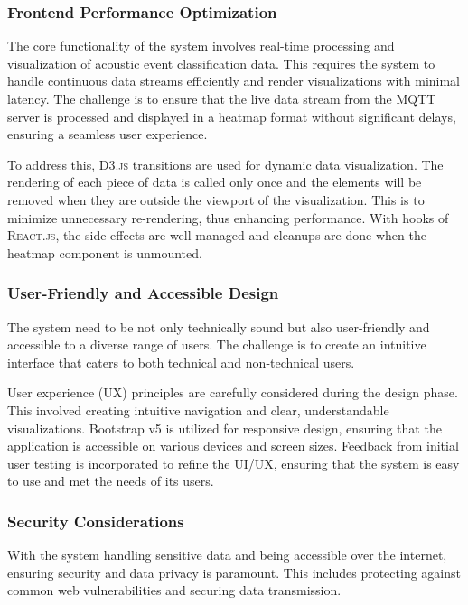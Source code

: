 \subsubsection{Frontend Performance Optimization}
The core functionality of the system involves real-time processing and visualization of acoustic event classification data. This requires the system to handle continuous data streams efficiently and render visualizations with minimal latency. The challenge is to ensure that the live data stream from the MQTT server is processed and displayed in a heatmap format without significant delays, ensuring a seamless user experience.

To address this, \textsc{D3.js} transitions are used for dynamic data visualization. The rendering of each piece of data is called only once and the elements will be removed when they are outside the viewport of the visualization. This is to minimize unnecessary re-rendering, thus enhancing performance. With hooks of \textsc{React.js}, the side effects are well managed and cleanups are done when the heatmap component is unmounted.

\subsubsection{User-Friendly and Accessible Design}
The system need to be not only technically sound but also user-friendly and accessible to a diverse range of users. The challenge is to create an intuitive interface that caters to both technical and non-technical users.

User experience (UX) principles are carefully considered during the design phase. This involved creating intuitive navigation and clear, understandable visualizations. Bootstrap v5 is utilized for responsive design, ensuring that the application is accessible on various devices and screen sizes.
Feedback from initial user testing is incorporated to refine the UI/UX, ensuring that the system is easy to use and met the needs of its users.

\subsubsection{Security Considerations}
With the system handling sensitive data and being accessible over the internet, ensuring security and data privacy is paramount. This includes protecting against common web vulnerabilities and securing data transmission.

